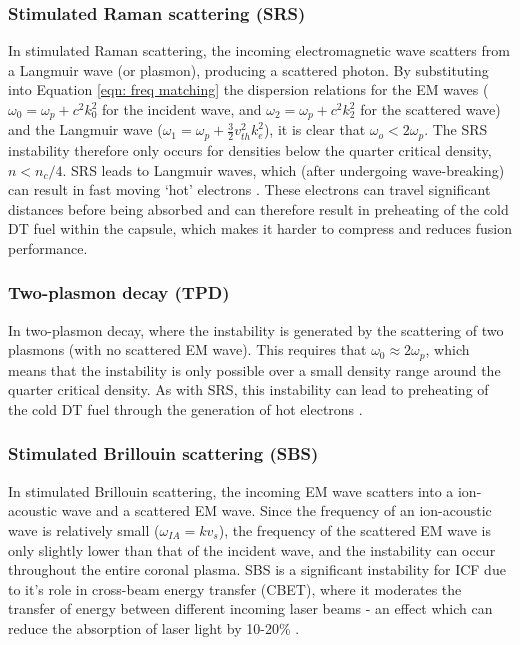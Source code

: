 \subsubsection{Stimulated Raman scattering (SRS)}
In stimulated Raman scattering, the incoming electromagnetic wave scatters from a Langmuir wave (or plasmon), producing a scattered photon. By substituting into Equation \ref{eqn: freq matching} the dispersion relations for the EM waves ($\omega_0 = \omega_p + c^2 k_0^2$ for the incident wave, and $\omega_2 = \omega_p + c^2 k_2^2$ for the scattered wave) and the Langmuir wave ($\omega_1 = \omega_p + \frac{3}{2} v_{th}^2 k_e^2$), it is clear that $\omega_o < 2 \omega_p$. The SRS instability therefore only occurs for densities below the quarter critical density, $n < n_c / 4$. SRS  leads to Langmuir waves, which (after undergoing wave-breaking) can result in fast moving `hot' electrons \cite{Rosenberg2018}. These electrons can travel significant distances before being absorbed and can therefore result in preheating of the cold DT fuel within the capsule, which makes it harder to compress and reduces fusion performance.

\subsubsection{Two-plasmon decay (TPD)}
In two-plasmon decay, where the instability is generated by the scattering of two plasmons (with no scattered EM wave). This requires that $\omega_0 \approx 2\omega_p$, which means that the instability is only possible over a small density range around the quarter critical density. As with SRS, this instability can lead to preheating of the cold DT fuel through the generation of hot electrons \cite{Yaakobi2000}.

\subsubsection{Stimulated Brillouin scattering (SBS)}
In stimulated Brillouin scattering, the incoming EM wave scatters into a ion-acoustic wave and a scattered EM wave. Since the frequency of an ion-acoustic wave is relatively small ($\omega_{IA} = kv_s$), the frequency of the scattered EM wave is only slightly lower than that of the incident wave, and the instability can occur throughout the entire coronal plasma. SBS is a significant instability for ICF due to it's role in cross-beam energy transfer (CBET), where it moderates the transfer of energy between different incoming laser beams - an effect which can reduce the absorption of laser light by 10-20\% \cite{Igumenshchev2012}.

